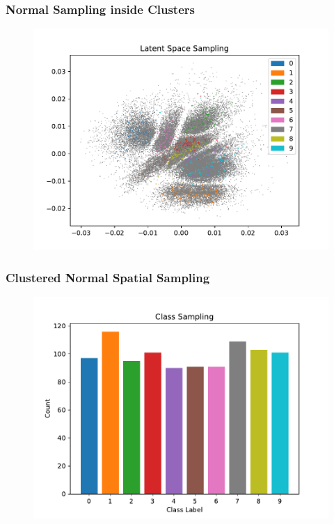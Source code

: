 \documentclass[10pt, usenames, dvipsnames, table]{beamer}
\begin{document}
\begin{frame}
  \frametitle{Normal Sampling inside Clusters}
  \begin{figure}
    \centering
    \includegraphics[width=\linewidth]
    {models/mnist_student_e300_L2_b64/multi-normal-cluster_sampling_1000}
    \caption{}
    \label{}
  \end{figure}
\end{frame}

\begin{frame}
  \frametitle{Clustered Normal Spatial Sampling}
  \begin{figure}
    \centering
    \includegraphics[width=\linewidth]
    {models/mnist_student_e300_L2_b64/multi-normal-cluster_sampling_distribution_1000}
    \caption{}
    \label{}
  \end{figure}
\end{frame}
\end{document}
